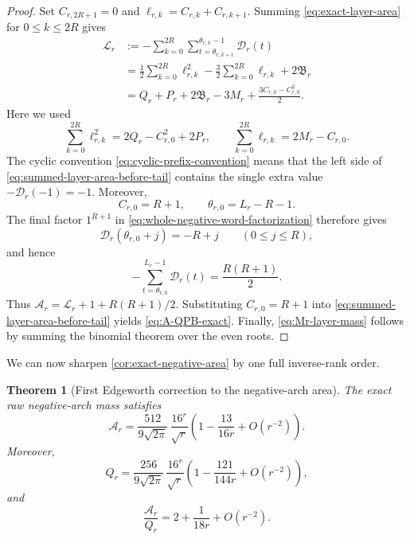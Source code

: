 \documentclass[11pt]{article}
\newtheorem{theorem}{Theorem}[section]
\theoremstyle{definition}
\theoremstyle{remark}
\begin{document}
\begin{proof}
Set \(C_{r,2R+1}=0\) and
\(\ell_{r,k}=C_{r,k}+C_{r,k+1}\).  Summing
\eqref{eq:exact-layer-area} for \(0\le k\le2R\) gives
\begin{align}
 \mathcal L_r
 &:=-\sum_{k=0}^{2R}
 \sum_{t=\theta_{r,k+1}}^{\theta_{r,k}-1}\mathscr D_r(t)
 \nonumber\\
 &=\frac12\sum_{k=0}^{2R}\ell_{r,k}^2
 -\frac32\sum_{k=0}^{2R}\ell_{r,k}
 +2\mathfrak B_r\nonumber\\
 &=Q_r+P_r+2\mathfrak B_r-3M_r
 +\frac{3C_{r,0}-C_{r,0}^2}{2}.
 \label{eq:summed-layer-area-before-tail}
\end{align}
Here we used
\[
 \sum_{k=0}^{2R}\ell_{r,k}^2
 =2Q_r-C_{r,0}^2+2P_r,
 \qquad
 \sum_{k=0}^{2R}\ell_{r,k}=2M_r-C_{r,0}.
\]
The cyclic convention \eqref{eq:cyclic-prefix-convention} means that the
left side of \eqref{eq:summed-layer-area-before-tail} contains the single
extra value \(-\mathscr D_r(-1)=-1\).  Moreover,
\[
 C_{r,0}=R+1,
 \qquad
 \theta_{r,0}=L_r-R-1.
\]
The final factor \(1^{R+1}\) in
\eqref{eq:whole-negative-word-factorization} therefore gives
\begin{equation}
 \mathscr D_r(\theta_{r,0}+j)=-R+j
 \qquad(0\le j\le R),
 \label{eq:terminal-tail-heights}
\end{equation}
and hence
\[
 -\sum_{t=\theta_{r,0}}^{L_r-1}\mathscr D_r(t)
 =\frac{R(R+1)}2.
\]
Thus \(\mathcal A_r=\mathcal L_r+1+R(R+1)/2\).  Substituting
\(C_{r,0}=R+1\) into \eqref{eq:summed-layer-area-before-tail} yields
\eqref{eq:A-QPB-exact}.  Finally,
\eqref{eq:Mr-layer-mass} follows by summing the binomial theorem over the
even roots.
\end{proof}

We can now sharpen \cref{cor:exact-negative-area} by one full inverse-rank
order.

\begin{theorem}[First Edgeworth correction to the negative-arch area]
\label{thm:first-edgeworth-negative-area}
The exact raw negative-arch mass satisfies
\begin{equation}
 \boxed{
 \mathcal A_r
 =\frac{512}{9\sqrt{2\pi}}\,
 \frac{16^r}{\sqrt r}
 \left(
 1-\frac{13}{16r}+O(r^{-2})
 \right).}
 \label{eq:A-first-edgeworth}
\end{equation}
Moreover,
\begin{equation}
 {
 Q_r
 =\frac{256}{9\sqrt{2\pi}}\,
 \frac{16^r}{\sqrt r}
 \left(
 1-\frac{121}{144r}+O(r^{-2})
 \right),}
 \label{eq:Q-first-edgeworth}
\end{equation}
and
\begin{equation}
 {
 \frac{\mathcal A_r}{Q_r}
 =2+\frac{1}{18r}+O(r^{-2}).}
 \label{eq:A-over-Q-first-edgeworth}
\end{equation}
\end{theorem}
\end{document}
